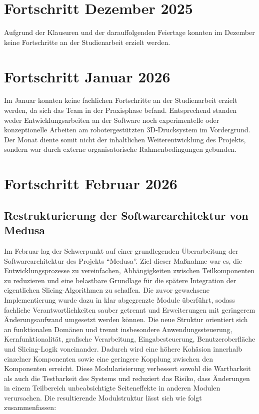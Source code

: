 \documentclass[
	paper=a4,
	fontsize=11pt,
	parskip=half,
	headings=normal,
	bibliography=totoc,
	listof=totoc
]{scrartcl}
\begin{document}
\section{Fortschritt Dezember 2025}
	Aufgrund der Klausuren und der darauffolgenden Feiertage konnten im Dezember keine Fortschritte an der Studienarbeit erzielt werden.

\section{Fortschritt Januar 2026}
	Im Januar konnten keine fachlichen Fortschritte an der Studienarbeit erzielt werden, da sich das Team in der Praxisphase befand.
	Entsprechend standen weder Entwicklungsarbeiten an der Software noch experimentelle oder konzeptionelle Arbeiten am robotergestützten 3D-Drucksystem im Vordergrund.
	Der Monat diente somit nicht der inhaltlichen Weiterentwicklung des Projekts, sondern war durch externe organisatorische Rahmenbedingungen gebunden.

\section{Fortschritt Februar 2026}

\subsection{Restrukturierung der Softwarearchitektur von Medusa}
	Im Februar lag der Schwerpunkt auf einer grundlegenden Überarbeitung der Softwarearchitektur des Projekts \enquote{Medusa}.
	Ziel dieser Maßnahme war es, die Entwicklungsprozesse zu vereinfachen, Abhängigkeiten zwischen Teilkomponenten zu reduzieren und eine belastbare Grundlage für die spätere Integration der eigentlichen Slicing-Algorithmen zu schaffen.
	Die zuvor gewachsene Implementierung wurde dazu in klar abgegrenzte Module überführt, sodass fachliche Verantwortlichkeiten sauber getrennt und Erweiterungen mit geringerem Änderungsaufwand umgesetzt werden können.
	Die neue Struktur orientiert sich an funktionalen Domänen und trennt insbesondere Anwendungssteuerung, Kernfunktionalität, grafische Verarbeitung, Eingabesteuerung, Benutzeroberfläche und Slicing-Logik voneinander.
	Dadurch wird eine höhere Kohäsion innerhalb einzelner Komponenten sowie eine geringere Kopplung zwischen den Komponenten erreicht.
	Diese Modularisierung verbessert sowohl die Wartbarkeit als auch die Testbarkeit des Systems und reduziert das Risiko, dass Änderungen in einem Teilbereich unbeabsichtigte Seiteneffekte in anderen Modulen verursachen.
	Die resultierende Modulstruktur lässt sich wie folgt zusammenfassen:
\end{document}
